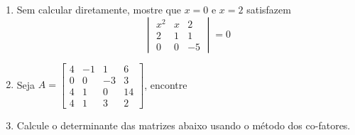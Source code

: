\documentclass[a4paper,5pt]{amsbook}
\begin{document}
\begin{enumerate}
	\vspace{0.5cm}
	\item Sem calcular diretamente, mostre que $x=0$ e $x=2$ satisfazem
		\[\begin{vmatrix}
			x^2 & x & 2 \\
			2 & 1 & 1 \\
			0 & 0 & -5
		\end{vmatrix}=0\]

	\item Seja $A = \begin{bmatrix}
				4 & -1 & 1 & 6 \\
				0 & 0 & -3 & 3 \\
				4 & 1 & 0 & 14 \\
				4 & 1 & 3 & 2
			\end{bmatrix}$,
		encontre

		\vspace{0.3cm}

	\vspace{0.5cm}
	\item Calcule o determinante das matrizes abaixo usando o m\'etodo dos
		co-fatores.


\end{enumerate}
\end{document}
